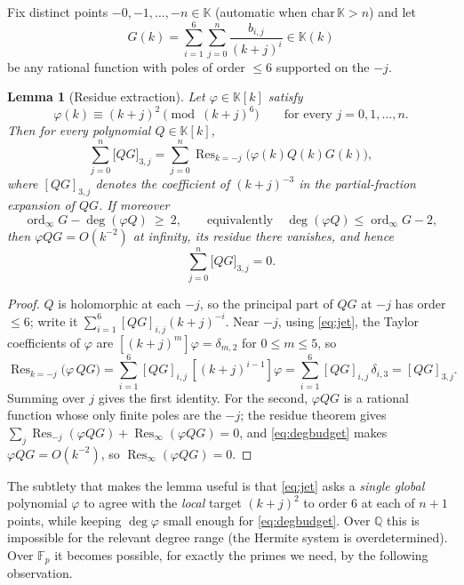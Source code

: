 \documentclass[11pt]{article}
\newtheorem{lemma}[theorem]{Lemma}
\theoremstyle{definition}
\DeclareMathOperator{\ord}{ord}
\DeclareMathOperator{\Res}{Res}
\newcommand{\Fp}{\mathbb{F}_p}
\newcommand{\Q}{\mathbb{Q}}
\begin{document}
Fix distinct points $-0,-1,\dots,-n\in\mathbb K$ (automatic when
$\mathrm{char}\,\mathbb K>n$) and let
\[
G(k)=\sum_{i=1}^{6}\sum_{j=0}^{n}\frac{b_{i,j}}{(k+j)^i}\in\mathbb K(k)
\]
be any rational function with poles of order $\le6$ supported on the $-j$.

\begin{lemma}[Residue extraction]\label{lem:extract}
Let $\varphi\in\mathbb K[k]$ satisfy
\begin{equation}\label{eq:jet}
\varphi(k)\equiv (k+j)^2 \pmod{(k+j)^6}\qquad\text{for every }j=0,1,\dots,n .
\end{equation}
Then for every polynomial $Q\in\mathbb K[k]$,
\[
\sum_{j=0}^{n}\bigl[QG\bigr]_{3,j}
=\sum_{j=0}^{n}\Res_{k=-j}\bigl(\varphi(k)Q(k)G(k)\bigr),
\]
where $[QG]_{3,j}$ denotes the coefficient of $(k+j)^{-3}$ in the partial-fraction
expansion of $QG$. If moreover
\begin{equation}\label{eq:degbudget}
\ord_\infty G-\deg(\varphi Q)\ \ge\ 2,\qquad\text{equivalently}\quad
\deg(\varphi Q)\le\ord_\infty G-2,
\end{equation}
then $\varphi QG=O(k^{-2})$ at infinity, its residue there vanishes, and hence
\[
\sum_{j=0}^{n}\bigl[QG\bigr]_{3,j}=0 .
\]
\end{lemma}

\begin{proof}
$Q$ is holomorphic at each $-j$, so the principal part of $QG$ at $-j$ has order
$\le6$; write it $\sum_{i=1}^{6}[QG]_{i,j}(k+j)^{-i}$. Near $-j$, using
\eqref{eq:jet}, the Taylor coefficients of $\varphi$ are
$[(k+j)^m]\varphi=\delta_{m,2}$ for $0\le m\le5$, so
\[
\Res_{k=-j}\bigl(\varphi\,QG\bigr)
=\sum_{i=1}^{6}[QG]_{i,j}\,[(k+j)^{i-1}]\varphi
=\sum_{i=1}^{6}[QG]_{i,j}\,\delta_{i,3}
=[QG]_{3,j}.
\]
Summing over $j$ gives the first identity. For the second, $\varphi QG$ is a
rational function whose only finite poles are the $-j$; the residue theorem gives
$\sum_j\Res_{-j}(\varphi QG)+\Res_\infty(\varphi QG)=0$, and \eqref{eq:degbudget}
makes $\varphi QG=O(k^{-2})$, so $\Res_\infty(\varphi QG)=0$.
\end{proof}

The subtlety that makes the lemma useful is that \eqref{eq:jet} asks a
\emph{single global} polynomial $\varphi$ to agree with the \emph{local} target
$(k+j)^2$ to order $6$ at each of $n+1$ points, while keeping $\deg\varphi$ small
enough for \eqref{eq:degbudget}. Over $\Q$ this is impossible for the relevant
degree range (the Hermite system is overdetermined). Over $\Fp$ it becomes
possible, for exactly the primes we need, by the following observation.
\end{document}
